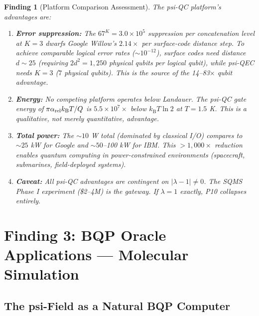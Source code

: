 \documentclass[11pt]{article}
\newtheorem{finding}[theorem]{Finding}
\theoremstyle{definition}
\theoremstyle{remark}
\newcommand{\kB}{k_{\mathrm{B}}}
\newcommand{\ee}[1]{\times 10^{#1}}
\begin{document}
\begin{finding}[Platform Comparison Assessment]
\label{find:platform-assessment}
The psi-QC platform's advantages are:

\begin{enumerate}
\item \textbf{Error suppression:} The $67^K = 3.0\ee{5}$ suppression
  per concatenation level at $K=3$ dwarfs Google Willow's $2.14\times$
  per surface-code distance step. To achieve comparable logical error
  rates ($\sim 10^{-12}$), surface codes need distance $d \sim 25$
  (requiring $2d^2 = 1{,}250$ physical qubits per logical qubit),
  while psi-QEC needs $K=3$ ($7$ physical qubits). This is the
  source of the 14--83$\times$ qubit advantage.

\item \textbf{Energy:} No competing platform operates below Landauer.
  The psi-QC gate energy of $\pi\alpha_{\rm rel}\kB T/Q$ is
  $5.5\ee{7}\times$ below $\kB T\ln 2$ at $T = 1.5$ K. This is a
  qualitative, not merely quantitative, advantage.

\item \textbf{Total power:} The $\sim 10$ W total (dominated by
  classical I/O) compares to $\sim 25$ kW for Google and $\sim 50$--100
  kW for IBM. This $>1{,}000\times$ reduction enables quantum
  computing in power-constrained environments (spacecraft, submarines,
  field-deployed systems).

\item \textbf{Caveat:} All psi-QC advantages are contingent on
  $|\lambda - 1| \neq 0$. The SQMS Phase I experiment (\$2--4M)
  is the gateway. If $\lambda = 1$ exactly, P10 collapses entirely.
\end{enumerate}
\end{finding}

\section{Finding 3: BQP Oracle Applications --- Molecular Simulation}
\label{sec:bqp-applications}

\subsection{The psi-Field as a Natural BQP Computer}
\label{sec:natural-bqp}
\end{document}
